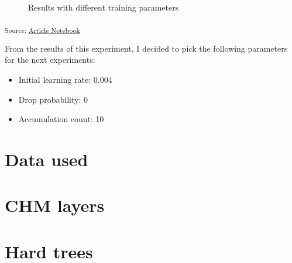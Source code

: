 \documentclass[
]{report}
\providecommand{\tightlist}{%
  \setlength{\itemsep}{0pt}\setlength{\parskip}{0pt}}\usepackage{longtable,booktabs,array}
\begin{document}
\begin{figure}[H]


\caption{\label{fig-training-parameters-data}Results with different
training parameters}

\end{figure}%

\textsubscript{Source:
\href{https://ZokszY.github.io/Geodan-internship-report/index-preview.html}{Article
Notebook}}

From the results of this experiment, I decided to pick the following
parameters for the next experiments:

\begin{itemize}
\tightlist
\item
  Initial learning rate: 0.004
\item
  Drop probability: 0
\item
  Accumulation count: 10
\end{itemize}

\section{Data used}\label{data-used}

\section{CHM layers}\label{chm-layers}

\section{Hard trees}\label{hard-trees}
\end{document}
